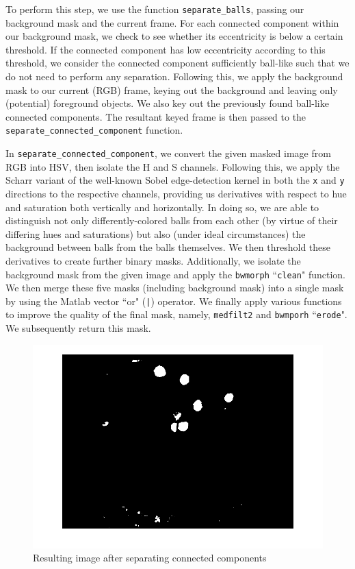 \documentclass[12pt,a4paper]{article}
\begin{document}
To perform this step, we use the function \texttt{separate\_balls}, passing our background mask and the current frame. For each connected component within our background mask, we check to see whether its eccentricity is below a certain threshold. If the connected component has low eccentricity according to this threshold, we consider the connected component sufficiently ball-like such that we do not need to perform any separation. Following this, we apply the background mask to our current (RGB) frame, keying out the background and leaving only (potential) foreground objects. We also key out the previously found ball-like connected components. The resultant keyed frame is then passed to the \texttt{separate\_connected\_component} function.

In \texttt{separate\_connected\_component}, we convert the given masked image from RGB into HSV, then isolate the H and S channels. Following this, we apply the Scharr variant of the well-known Sobel edge-detection kernel in both the \texttt{x} and \texttt{y} directions to the respective channels, providing us derivatives with respect to hue and saturation both vertically and horizontally. In doing so, we are able to distinguish not only differently-colored balls from each other (by virtue of their differing hues and saturations) but also (under ideal circumstances) the background between balls from the balls themselves. We then threshold these derivatives to create further binary masks. Additionally, we isolate the background mask from the given image and apply the \texttt{bwmorph} ``\texttt{clean}" function. We then merge these five masks (including background mask) into a single mask by using the Matlab vector ``or" (\texttt{|}) operator. We finally apply various functions to improve the quality of the final mask, namely, \texttt{medfilt2} and \texttt{bwmporh} ``\texttt{erode}". We subsequently return this mask.

\begin{figure}
	\centering
    \includegraphics[width=140mm]{frame_35_imgs/separate_balls.png}
    \caption{Resulting image after separating connected components}
	\label{my-label01}
\end{figure}
\end{document}
